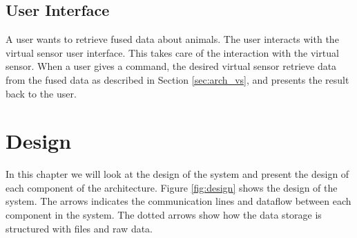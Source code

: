 \documentclass[USenglish]{uit-thesis}
\begin{document}


\section{User Interface} \label{sec:arch_user_int}
A user wants to retrieve fused data about animals. The user interacts with the virtual sensor user interface. This takes care of the interaction with the virtual sensor. When a user gives a command, the desired virtual sensor retrieve data from the fused data as described in Section \ref{sec:arch_vs}, and presents the result back to the user.




\chapter{Design}

In this chapter we will look at the design of the system and present the design of each component of the architecture. Figure \ref{fig:design} shows the design of the system. The arrows indicates the communication lines and dataflow between each component in the system. The dotted arrows show how the data storage is structured with files and raw data.

\end{document}
